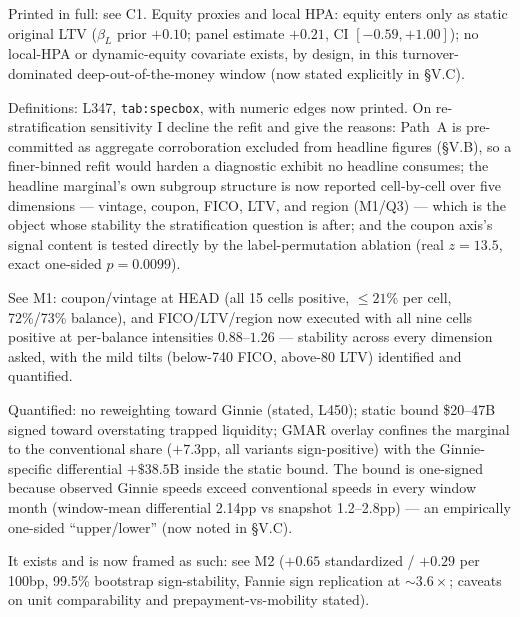 \documentclass[11pt]{article}
\newcommand{\mlabel}[1]{\texttt{#1}}
\begin{document}
\begin{description}[leftmargin=0pt, itemsep=0.6em]

\item[Q1 --- Exact hazard models, $\beta_1$ definition, covariates.]
Printed in full: see C1. Equity proxies and local HPA: equity enters only as
static original LTV ($\beta_L$ prior $+0.10$; panel estimate $+0.21$, CI
$[-0.59, +1.00]$); no local-HPA or dynamic-equity covariate exists, by design,
in this turnover-dominated deep-out-of-the-money window (now stated explicitly
in \S V.C).

\item[Q2 --- Strata definition; sensitivity to alternative stratifications.]
Definitions: L347, \mlabel{tab:specbox}, with numeric edges now printed. On
re-stratification sensitivity I decline the refit and give the reasons:
Path~A is pre-committed as aggregate corroboration excluded from headline
figures (\S V.B), so a finer-binned refit would harden a diagnostic exhibit no
headline consumes; the headline marginal's own subgroup structure is now
reported cell-by-cell over five dimensions --- vintage, coupon, FICO, LTV, and
region (M1/Q3) --- which is the object whose stability the stratification
question is after; and the coupon axis's signal content is tested directly by
the label-permutation ablation (real $z = 13.5$, exact one-sided
$p = 0.0099$).

\item[Q3 --- Subgroup decompositions of the $+9.2$pp.]
See M1: coupon/vintage at HEAD (all 15 cells positive, $\leq 21\%$ per cell,
72\%/73\% balance), and FICO/LTV/region now executed with all nine cells
positive at per-balance intensities $0.88$--$1.26$ --- stability across every
dimension asked, with the mild tilts (below-740 FICO, above-80 LTV) identified
and quantified.

\item[Q4 --- Ginnie handling; upper/lower bounds.]
Quantified: no reweighting toward Ginnie (stated, L450); static bound
\$20--47B signed toward overstating trapped liquidity; GMAR overlay confines
the marginal to the conventional share ($+7.3$pp, all variants sign-positive)
with the Ginnie-specific differential $+\$38.5$B inside the static bound. The
bound is one-signed because observed Ginnie speeds exceed conventional speeds
in every window month (window-mean differential 2.14pp vs snapshot 1.2--2.8pp)
--- an empirically one-sided ``upper/lower'' (now noted in \S V.C).

\item[Q5 --- In-sample elasticity to triangulate the band.]
It exists and is now framed as such: see M2 ($+0.65$ standardized / $+0.29$ per
100bp, 99.5\% bootstrap sign-stability, Fannie sign replication at
${\sim}3.6\times$; caveats on unit comparability and prepayment-vs-mobility
stated).


\end{description}
\end{document}
